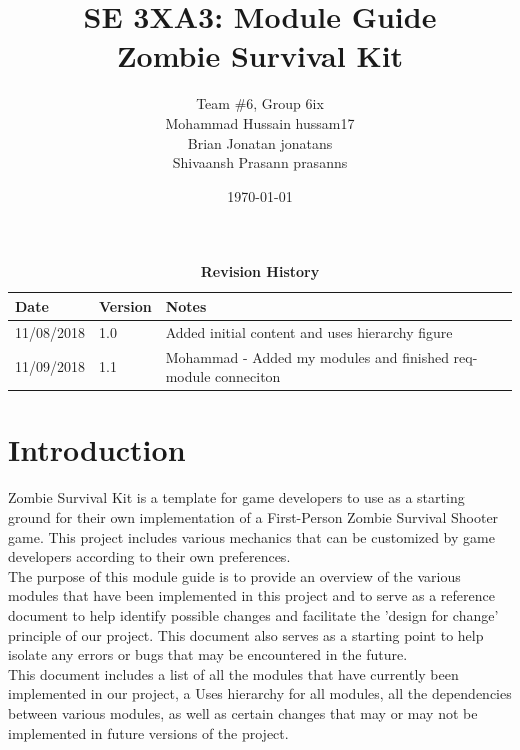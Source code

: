 \documentclass[12pt, titlepage]{article}
\title{SE 3XA3: Module Guide\\Zombie Survival Kit}
\author{Team \#6, Group 6ix
		\\ Mohammad Hussain hussam17
		\\ Brian Jonatan jonatans
		\\ Shivaansh Prasann prasanns
}
\date{\today}
\begin{document}
\maketitle

\tableofcontents
\listoftables
\listoffigures

\begin{table}[bp]
\caption{\bf Revision History}
\begin{tabularx}{\textwidth}{p{3cm}p{2cm}X}
\toprule {\bf Date} & {\bf Version} & {\bf Notes}\\
\midrule
11/08/2018 & 1.0 & Added initial content and uses hierarchy figure\\
11/09/2018 & 1.1 & Mohammad - Added my modules and finished req-module conneciton\\
\bottomrule
\end{tabularx}
\end{table}

\newpage


\section{Introduction}


Zombie Survival Kit is a template for game developers to use as a starting ground for their own implementation of a First-Person Zombie Survival Shooter game. This project includes various mechanics that can be customized by game developers according to their own preferences.\\
\newline
The purpose of this module guide is to provide an overview of the various modules that have been implemented in this project and to serve as a reference document to help identify possible changes and facilitate the 'design for change' principle of our project. This document also serves as a starting point to help isolate any errors or bugs that may be encountered in the future.\\
\newline
This document includes a list of all the modules that have currently been implemented in our project, a Uses hierarchy for all modules, all the dependencies between various modules, as well as certain changes that may or may not be implemented in future versions of the project.

\newpage
\end{document}
